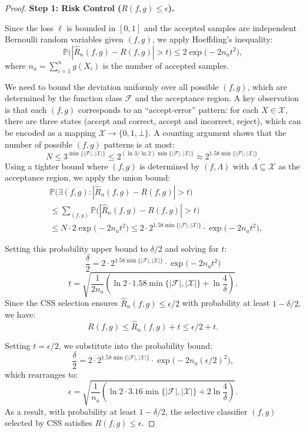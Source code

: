 \documentclass[journal,twoside,web]{ieeecolor}
\begin{document}
\begin{proof}
\textbf{Step 1: Risk Control ($R(f,g) \leq \epsilon$).}


Since the loss $\ell$ is bounded in $[0,1]$ and the accepted samples are independent Bernoulli random variables given $(f,g)$, we apply Hoeffding's inequality:
\[
\mathbb{P}\bigl(|\hat{R}_n(f,g) - R(f,g)| > t\bigr) \leq 2\exp\bigl(-2n_a t^2\bigr),
\]
where $n_a = \sum_{i=1}^n g(X_i)$ is the number of accepted samples.

We need to bound the deviation uniformly over all possible $(f,g)$, which are determined by the function class $\mathcal{F}$ and the acceptance region. A key observation is that each $(f,g)$ corresponds to an ``accept-error'' pattern: for each $X \in \mathcal{X}$, there are three states (accept and correct, accept and incorrect, reject), which can be encoded as a mapping $\mathcal{X} \to \{0,1,\bot\}$.
A counting argument shows that the number of possible $(f,g)$ patterns is at most:
\[
N \leq 3^{\min\{|\mathcal{F}|,|\mathcal{X}|\}} \leq 2^{(\ln 3 / \ln 2) \min\{|\mathcal{F}|,|\mathcal{X}|\}} \approx 2^{1.58 \min\{|\mathcal{F}|,|\mathcal{X}|\}}.
\]
Using a tighter bound where $(f,g)$ is determined by $(f, \Lambda)$ with $\Lambda \subseteq \mathcal{X}$ as the acceptance region, we apply the union bound:
\begin{align*}
    & \mathbb{P}\bigl(\exists (f,g) : |\hat{R}_n(f,g) - R(f,g)| > t\bigr) \\
    & \leq \sum_{(f,g)} \mathbb{P}\bigl(|\hat{R}_n(f,g) - R(f,g)| > t\bigr) \\
    & \leq N \cdot 2\exp\bigl(-2n_{a} t^2\bigr) \leq 2 \cdot 2^{1.58 \min\{|\mathcal{F}|,|\mathcal{X}|\}} \cdot \exp\bigl(-2n_{a} t^2\bigr),
\end{align*}

Setting this probability upper bound to $\delta/2$ and solving for $t$:
\[
\frac{\delta}{2} = 2 \cdot 2^{1.58\min\{|\mathcal{F}|,|\mathcal{X}|\}} \cdot \exp\bigl(-2n_{a} t^2\bigr)
\]
\[
t = \sqrt{\frac{1}{2n_{a}} \left( \ln 2 \cdot 1.58\min\{|\mathcal{F}|,|\mathcal{X}|\} + \ln \frac{4}{\delta} \right)}.
\]
Since the CSS selection ensures $\hat{R}_n(f,g) \leq \epsilon/2$ with probability at least $1-\delta/2$, we have:
\[
R(f,g) \leq \hat{R}_n(f,g) + t \leq \epsilon/2 + t.
\]


Setting $t = \epsilon/2$, we substitute into the probability bound:
\[
\frac{\delta}{2} = 2 \cdot 2^{1.58\min\{|\mathcal{F}|,|\mathcal{X}|\}} \cdot \exp\bigl(-2n_{a} (\epsilon/2)^2\bigr),
\]
which rearranges to:
\[
\epsilon = \sqrt{\frac{1}{n_{a}} \left( \ln 2 \cdot 3.16\min\{|\mathcal{F}|,|\mathcal{X}|\} + 2\ln \frac{4}{\delta} \right)}.
\]
As a result, with probability at least $1-\delta/2$, the selective classifier $(f,g)$ selected by CSS satisfies $R(f,g) \leq \epsilon$.


\end{proof}
\end{document}
